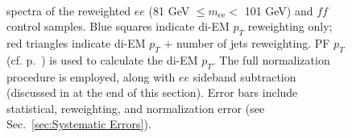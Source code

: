 \documentclass[dissertation.tex]{subfiles}
\begin{document}
\begin{figure}
	\\
	\hspace{1cm}
	\caption{\MET spectra of the reweighted $ee$ (81 GeV $\leq m_{\mathrm{ee}} <$ 101 GeV) and $\mathit{ff}$ control samples.  Blue squares indicate di-EM $p_{T}$ reweighting only; red triangles indicate di-EM $p_{T}$ + number of jets reweighting.  PF $p_{T}$ (cf. p.~\pageref{fig:ET_bias_vs_EMF}) is used to calculate the di-EM $p_{T}$.  The full normalization procedure is employed, along with $ee$ sideband subtraction (discussed in at the end of this section).  Error bars include statistical, reweighting, and normalization error (see Sec.~\ref{sec:Systematic Errors}).}
	\label{fig:dijet_pT_and_Nj_vs_dijet_pT_reweighting}
\end{figure}
\end{document}
